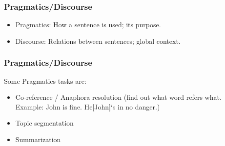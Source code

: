   
\begin{frame}[fragile]
  \frametitle{Pragmatics/Discourse}
  \begin{itemize}
  \item Pragmatics:  How a sentence is used; its purpose. 
\item Discourse:  Relations between sentences; global context.

  	  \end{itemize}
 \end{frame} 
 
\begin{frame}[fragile]
  \frametitle{Pragmatics/Discourse}
  Some Pragmatics tasks are:
  \begin{itemize}
  \item Co-reference / Anaphora resolution (find out what word refers what. Example: John is fine. He[John]‘s in no danger.)
  \item Topic segmentation
  \item Summarization
  	  \end{itemize}
 \end{frame} 
 

 
 





